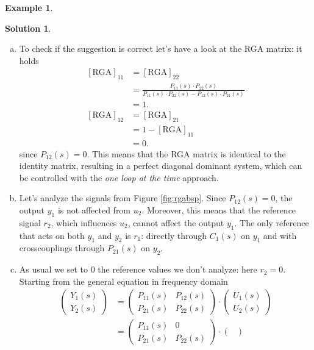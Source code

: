 \documentclass[a4paper,12 pt]{article}
\numberwithin{equation}{section}
\theoremstyle{definition}
\newtheorem{bsp}{Example}
\theoremstyle{remark}
\theoremstyle{definition}
\newtheorem*{lsg}{Solution}
\theoremstyle{definition}
\theoremstyle{definition}
\theoremstyle{remark}
\begin{document}
\begin{bsp}
\begin{lsg}
\
\begin{enumerate}[(a)]
\item To check if the suggestion is correct let's have a look at the RGA matrix: it holds
\begin{equation*}
\begin{split}
[\text{RGA}]_{11}&=[\text{RGA}]_{22}\\
&=\frac{P_{11}(s)\cdot P_{22}(s)}{P_{11}(s)\cdot P_{22}(s)-P_{12}(s)\cdot P_{21}(s)}\\
&=1.\\
[\text{RGA}]_{12}&=[\text{RGA}]_{21}\\
&=1-[\text{RGA}]_{11}\\
&=0.
\end{split}
\end{equation*}
since $P_{12}(s)=0$. This means that the RGA matrix is identical to the identity matrix, resulting in a perfect diagonal dominant system, which can be controlled with the \textit{one loop at the time} approach.
\item Let's analyze the signals from Figure \ref{fig:rgabsp}. Since $P_{12}(s)=0$, the output $y_1$ is not affected from $u_2$. Moreover, this means that the reference signal $r_2$, which influences $u_2$, cannot affect the output $y_1$. The only reference that acts on both $y_1$ and $y_2$ is $r_1$: directly through $C_1(s)$ on $y_1$ and with crosscouplings through $P_{21}(s)$ on $y_2$.
\item As usual we set to 0 the reference values we don't analyze: here $r_2=0$. Starting from the general equation in frequency domain 
\begin{equation*}
\begin{split}
\begin{pmatrix}
Y_1(s)\\
Y_2(s)
\end{pmatrix}&=\begin{pmatrix}
P_{11}(s)&P_{12}(s)\\
P_{21}(s)&P_{22}(s)
\end{pmatrix}\cdot 
\begin{pmatrix}
U_1(s)\\
U_2(s)
\end{pmatrix}\\
&=\begin{pmatrix}
P_{11}(s)&0\\
P_{21}(s)&P_{22}(s)
\end{pmatrix}\cdot 
\begin{pmatrix}

\end{pmatrix}
\end{split}
\end{equation*}
\end{enumerate}
\end{lsg}
\end{bsp}
\end{document}
